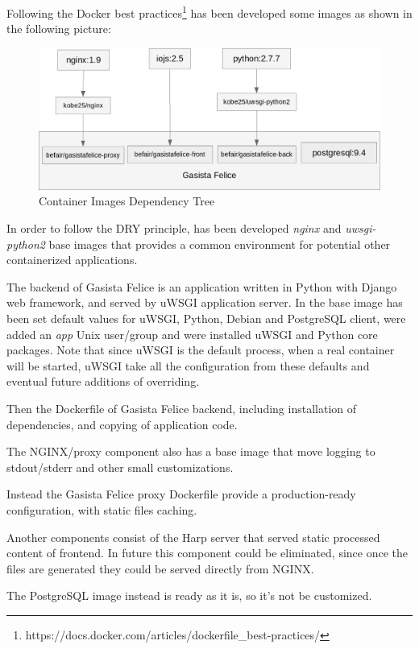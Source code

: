 Following the Docker best practices\footnote{https://docs.docker.com/articles/dockerfile\_best-practices/} has been
developed some images as shown in the following picture:

\begin{figure}[htbp]
\centering
\includegraphics{media/ch3-images_tree.png}
\caption{Container Images Dependency Tree}
\end{figure}

In order to follow the DRY principle, has been developed \textit{nginx}
and \textit{uwsgi-python2} base images that provides a common
environment for potential other containerized applications.

The backend of Gasista Felice is an application written in Python with
Django web framework, and served by uWSGI application server. In the
base image has been set default values for uWSGI, Python, Debian and
PostgreSQL client, were added an \textit{app} Unix user/group and were
installed uWSGI and Python core packages. Note that since uWSGI is the
default process, when a real container will be started, uWSGI take all
the configuration from these defaults and eventual future additions of
overriding.

Then the Dockerfile of Gasista Felice backend, including installation of
dependencies, and copying of application code.

The NGINX/proxy component also has a base image that move logging to
stdout/stderr and other small customizations.

Instead the Gasista Felice proxy Dockerfile provide a production-ready
configuration, with static files caching.

Another components consist of the Harp server that served static
processed content of frontend. In future this component could be
eliminated, since once the files are generated they could be served
directly from NGINX.

The PostgreSQL image instead is ready as it is, so it's not be
customized.

